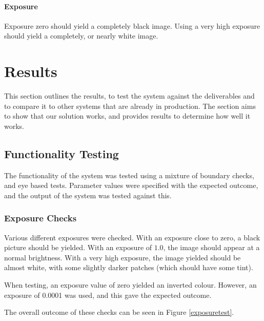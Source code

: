 \documentclass[10pt,a4paper]{article}
\begin{document}
\paragraph{Exposure}
Exposure zero should yield a completely black image. Using a very high exposure should yield a completely, or nearly white image.

\section{Results}
This section outlines the results, to test the system against the deliverables and to compare it to other systems that are already in production.
The section aims to show that our solution works, and provides results to determine how well it works.

\subsection{Functionality Testing}
The functionality of the system was tested using a mixture of boundary checks, and eye based tests. Parameter values were specified with the expected
outcome, and the output of the system was tested against this.

\subsubsection{Exposure Checks}
Various different exposures were checked. With an exposure close to zero, a black picture should be yielded. With an exposure of $1.0$,
the image should appear at a normal brightness. With a very high exposure, the image yielded should be almost white, with some slightly darker patches 
(which should have some tint).

When testing, an exposure value of zero yielded an inverted colour. However, an exposure of 0.0001 was used, and this gave the expected outcome.

The overall outcome of these checks can be seen in Figure \ref{exposuretest}.

\end{document}
